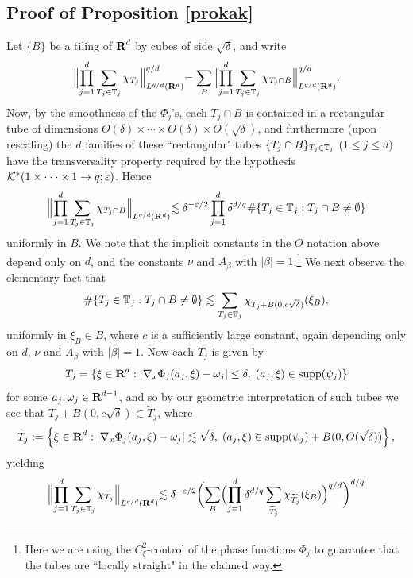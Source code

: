 \subsection*{Proof of Proposition \ref{prokak}} Let $\{B\}$ be a
tiling of ${\hbox{\bf R}}^{d}$ by cubes of side $\sqrt{\delta}$, and write
$$
\Bigl\|\prod_{j=1}^{d}\sum_{T_{j}\in{\mathbb{T}}_{j}}\chi_{T_{j}}
\Bigl\|_{L^{q/d}({\bf R}^d)}^{q/d}
=\sum_{B}\Bigl\|\prod_{j=1}^{d}\sum_{T_{j}\in{\mathbb{T}}_{j}}\chi_{T_{j}\cap
B}\Bigl\|_{L^{q/d}({\bf R}^d)}^{q/d}.
$$
Now, by the smoothness of the $\Phi_j$'s, each $T_{j}\cap B$ is
contained in a rectangular tube of dimensions
$O(\delta)\times\cdots\times O(\delta)\times O(\sqrt{\delta})$,
and furthermore (upon rescaling) the $d$ families of these
``rectangular" tubes $\{T_{j}\cap B\}_{T_{j}\in{\mathbb{T}}_{j}}$
($1\leq j\leq d$) have the transversality property required by the
hypothesis ${\mathcal{K}}^{*}(1\times\cdot\cdot\cdot\times 1\rightarrow
q;\varepsilon)$. Hence
$$
\Bigl\|\prod_{j=1}^{d}\sum_{T_{j}\in{\mathbb{T}}_{j}}\chi_{T_{j}\cap
B}\Bigl\|_{L^{q/d}({\bf R}^d)} \lesssim
\delta^{-\varepsilon/2}\prod_{j=1}^{d}\delta^{d/q}\mbox{\#}\{
T_{j}\in{\mathbb{T}}_{j}:T_{j}\cap B\not=\emptyset\}
$$
uniformly in $B$. We note that the implicit constants in the $O$
notation above depend only on $d$, and the constants $\nu$ and
$A_{\beta}$ with $|\beta|=1$.\footnote{Here we are using the
$C^{2}_{\xi}$-control of the phase functions $\Phi_{j}$ to
guarantee that the tubes are ``locally straight" in the claimed
way.} We next observe the elementary fact that
$$
\mbox{\#}\{ T_{j}\in{\mathbb{T}}_{j}:T_{j}\cap B\not=\emptyset\}
\lesssim
\sum_{T_{j}\in{\mathbb{T}}_{j}}\chi_{T_{j}+B(0,c\sqrt{\delta})}(\xi_{B}),
$$
uniformly in $\xi_{B}\in B$, where $c$ is a sufficiently large
constant, again depending only on $d$, $\nu$ and $A_{\beta}$ with
$|\beta|= 1$. Now each $T_{j}$ is given by
$$
T_{j}=\{\xi\in{\hbox{\bf R}}^{d}:
|\nabla_{x}\Phi_{j}(a_{j},\xi)-\omega_{j}|\leq\delta,\;
(a_{j},\xi)\in{\operatorname{supp}}(\psi_{j})\}
$$
for some $a_{j},\omega_{j}\in{\hbox{\bf R}}^{d-1}$, and so by our geometric
interpretation of such tubes we see that
$
T_{j}+B(0,c\sqrt{\delta})
\subset\widetilde{T}_{j}$, where
$$\widetilde{T}_{j}:=\left\{\xi\in{\hbox{\bf R}}^d:|\nabla_{x}\Phi_{j}(a_j,\xi)-\omega_j|\lesssim\sqrt{\delta},\;
(a_{j},\xi)\in{\operatorname{supp}}(\psi_{j}) + B(0, O(\sqrt{\delta}))\right\},
$$
yielding
\begin{eqnarray*}
\begin{aligned}
\Bigl\|\prod_{j=1}^{d}\sum_{T_{j}\in{\mathbb{T}}_{j}}\chi_{T_{j}}\Bigl\|_{L^{q/d}({\bf
R}^d)}
\lesssim\delta^{-\varepsilon/2}\biggl(\sum_{B}\Bigl(\prod_{j=1}^{d}\delta^{d/q}\sum_{\widetilde{T}_{j}}
\chi_{\widetilde{T}_{j}}(\xi_{B})\Bigr)^{q/d}\biggr)^{d/q}
\end{aligned}
\end{eqnarray*}
